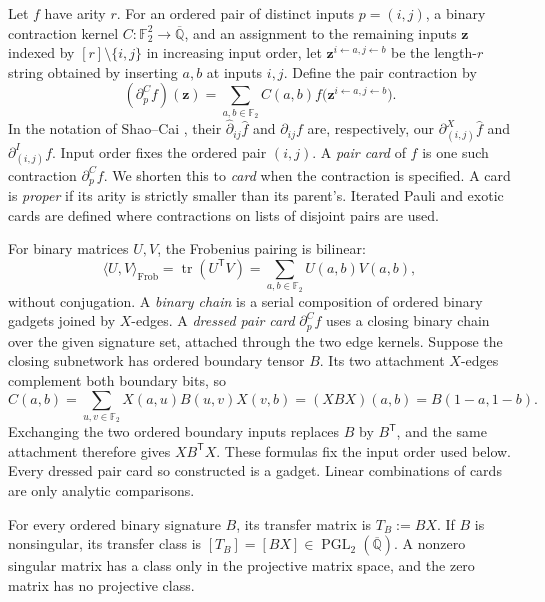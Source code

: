 \documentclass[11pt,letterpaper,onecolumn]{article}
\theoremstyle{plain}
\theoremstyle{definition}
\theoremstyle{remark}
\newcommand{\AlgNums}{\overline{\mathbb Q}}
\newcommand{\Ftwo}{\mathbb F_2}
\newcommand{\PGL}{\operatorname{PGL}}
\begin{document}
Let \(f\) have arity \(r\).  For an ordered pair of distinct inputs
\(p=(i,j)\), a binary contraction kernel
\(C:\Ftwo^2\to\AlgNums\), and an assignment to the remaining inputs \({\mathbf{z}}\) indexed by
\([r]\setminus\{i,j\}\) in increasing input order, let
\({\mathbf{z}}^{i\leftarrow a,j\leftarrow b}\) be the length-\(r\) string obtained by
inserting \(a,b\) at inputs \(i,j\).  Define the pair contraction by
\begin{equation*}
  (\partial_p^C f)({\mathbf{z}})
  =
  \sum_{a,b\in\Ftwo}C(a,b)
  f\bigl({\mathbf{z}}^{i\leftarrow a,j\leftarrow b}\bigr).
\end{equation*}
In the notation of Shao--Cai
\cite[full version, Section~2.4]{ShaoCai2020}, their
\(\widehat\partial_{ij}\widehat f\) and \(\partial_{ij}f\) are,
respectively, our \(\partial_{(i,j)}^X\widehat f\) and
\(\partial_{(i,j)}^I f\).  Input order fixes the ordered pair \((i,j)\).
A \emph{pair card} of \(f\) is one such contraction
\(\partial_p^C f\). We shorten this to \emph{card} when the contraction
is specified.  A card is \emph{proper} if its arity is strictly smaller
than its parent's.  Iterated Pauli and exotic cards are defined where
contractions on lists of disjoint pairs are used.

For binary matrices
\(U,V\), the Frobenius pairing is bilinear:
\begin{equation*}
  \langle U,V\rangle_{\mathrm{Frob}}
  =\operatorname{tr}(U^{\mathsf T}V)
  =\sum_{a,b\in\Ftwo}U(a,b)V(a,b),
\end{equation*}
without conjugation. A \emph{binary chain} is a serial
composition of ordered binary gadgets joined by \(X\)-edges.  A
\emph{dressed pair card} \(\partial_p^Cf\) uses a closing binary
chain over the given signature set, attached through the two edge kernels.  Suppose
the closing subnetwork has ordered boundary tensor \(B\).  Its two
attachment \(X\)-edges complement both boundary bits, so
\begin{equation*}
  C(a,b)
  =\sum_{u,v\in\Ftwo}X(a,u)B(u,v)X(v,b)
  =(XBX)(a,b)
  =B(1-a,1-b).
\end{equation*}
Exchanging the two ordered boundary inputs replaces \(B\) by
\(B^{\mathsf T}\), and the same attachment therefore gives
\(XB^{\mathsf T}X\).  These formulas fix the input order used
below. Every dressed pair card so constructed is a gadget. Linear
combinations of cards are only analytic comparisons.

For every ordered binary signature \(B\), its transfer matrix is
\(T_B:=BX\).  If \(B\) is nonsingular, its transfer class is
\([T_B]=[BX]\in\PGL_2(\AlgNums)\).  A nonzero singular matrix has a
class only in the projective matrix space, and the zero matrix has no
projective class.
\end{document}

